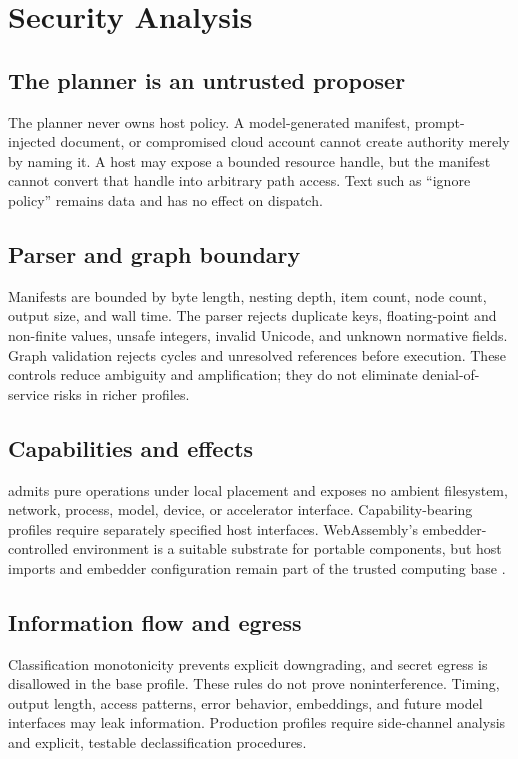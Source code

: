 \section{Security Analysis}
\label{sec:security}

\subsection{The planner is an untrusted proposer}
The planner never owns host policy. A model-generated manifest, prompt-injected document, or compromised cloud account cannot create authority merely by naming it. A host may expose a bounded resource handle, but the manifest cannot convert that handle into arbitrary path access. Text such as ``ignore policy'' remains data and has no effect on dispatch.

\subsection{Parser and graph boundary}
Manifests are bounded by byte length, nesting depth, item count, node count, output size, and wall time. The parser rejects duplicate keys, floating-point and non-finite values, unsafe integers, invalid Unicode, and unknown normative fields. Graph validation rejects cycles and unresolved references before execution. These controls reduce ambiguity and amplification; they do not eliminate denial-of-service risks in richer profiles.

\subsection{Capabilities and effects}
\Uzero admits pure operations under local placement and exposes no ambient filesystem, network, process, model, device, or accelerator interface. Capability-bearing profiles require separately specified host interfaces. WebAssembly's embedder-controlled environment is a suitable substrate for portable components, but host imports and embedder configuration remain part of the trusted computing base \cite{W3CWasm2026}.

\subsection{Information flow and egress}
Classification monotonicity prevents explicit downgrading, and \textsf{secret} egress is disallowed in the base profile. These rules do not prove noninterference. Timing, output length, access patterns, error behavior, embeddings, and future model interfaces may leak information. Production profiles require side-channel analysis and explicit, testable declassification procedures.

